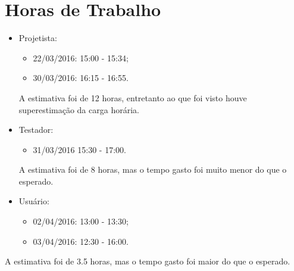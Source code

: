\documentclass[12pt,a4paper,final]{report}
\begin{document}
\section*{Horas de Trabalho}
\begin{itemize}
\item Projetista:
\begin{itemize}
\item 22/03/2016: 15:00 - 15:34;
\item 30/03/2016: 16:15 - 16:55.
\end{itemize}
A estimativa foi de 12  horas, entretanto ao que foi visto houve superestimação da carga horária.

\item Testador: 
\begin{itemize}
\item 31/03/2016 15:30 - 17:00.
\end{itemize}
A estimativa foi de 8 horas, mas o tempo gasto foi muito menor do que o esperado.  

\item Usuário:
\begin{itemize}
\item 02/04/2016: 13:00 - 13:30;
\item 03/04/2016: 12:30 - 16:00.
\end{itemize}
\end{itemize}
A estimativa foi de 3.5 horas, mas o tempo gasto foi maior do que o esperado. 
\end{document}
